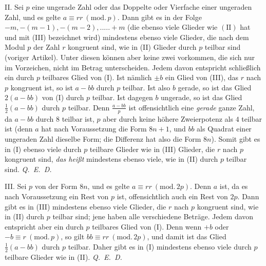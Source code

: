 II. Sei $p$ eine ungerade Zahl oder das Doppelte oder Vierfache einer ungeraden Zahl, und es gelte $a\equiv rr\ (\mathrm{mod.}\,p)$. Dann gibt es in der Folge $-m,-(m-1),-(m-2),.....+m$ (die ebenso viele Glieder wie $(\mathrm{II})$ hat und mit (III) bezeichnet wird) mindestens ebenso viele Glieder, die nach dem Modul $p$ der Zahl $r$ kongruent sind, wie in (II) Glieder durch $p$ teilbar sind (voriger Artikel). Unter diesen können aber keine zwei vorkommen, die sich nur im Vorzeichen, nicht im Betrag unterscheiden. Jedem davon entspricht schließlich ein durch $p$ teilbares Glied von (I). Ist nämlich $\pm b$ ein Glied von (III), das $r$ nach $p$ kongruent ist, so ist $a-bb$ durch $p$ teilbar. Ist also $b$ gerade, so ist das Glied $2(a-bb)$ von (I) durch $p$ teilbar. Ist dagegen $b$ ungerade, so ist das Glied $\frac12(a-bb)$ durch $p$ teilbar. Denn $\frac{a-bb}{p}$ ist offensichtlich eine \textit{gerade} ganze Zahl, da $a-bb$ durch $8$ teilbar ist, $p$ aber durch keine höhere Zweierpotenz als $4$ teilbar ist (denn $a$ hat nach Voraussetzung die Form $8n+1$, und $bb$ als Quadrat einer ungeraden Zahl dieselbe Form; die Differenz hat also die Form $8n$). Somit gibt es in (I) ebenso viele durch $p$ teilbare Glieder wie in (III) Glieder, die $r$ nach $p$ kongruent sind, \textit{das heißt} mindestens ebenso viele, wie in (II) durch $p$ teilbar sind. \mbox{\textit{Q. E. D.}}

III. Sei $p$ von der Form $8n$, und es gelte $a\equiv rr\ (\mathrm{mod.}\,2p)$. Denn $a$ ist, da es nach Voraussetzung ein Rest von $p$ ist, offensichtlich auch ein Rest von $2p$. Dann gibt es in (III) mindestens ebenso viele Glieder, die $r$ nach $p$ kongruent sind, wie in (II) durch $p$ teilbar sind; jene haben alle verschiedene Beträge. Jedem davon entspricht aber ein durch $p$ teilbares Glied von (I). Denn wenn $+b$ oder $-b\equiv r\ (\mathrm{mod.}\,p)$, so gilt $bb\equiv rr\ (\mathrm{mod.}\,2p)$, und damit ist das Glied $\frac12(a-bb)$ durch $p$ teilbar. Daher gibt es in (I) mindestens ebenso viele durch $p$ teilbare Glieder wie in (II). \mbox{\textit{Q. E. D.}}

